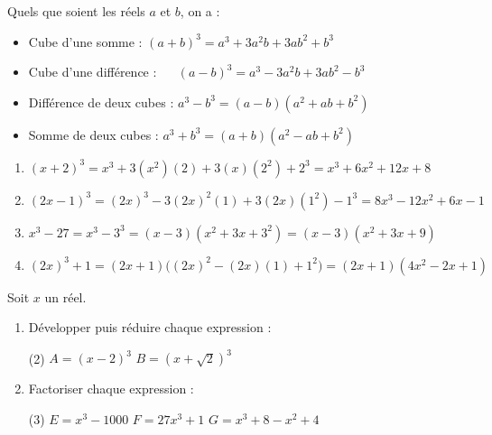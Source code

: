 \documentclass[10pt, a4paper]{article}
\begin{document}
\begin{Propriete}[]
Quels que soient les réels $a$ et $b$, on a :
\begin{itemize}
    \item Cube d'une somme : \quad $(a+b)^3 = a^3 + 3a^2b + 3ab^2 + b^3$
    \item Cube d'une différence : ~~ $(a-b)^3 = a^3 - 3a^2b + 3ab^2 - b^3$
    \item Différence de deux cubes : $a^3 - b^3 = (a-b)(a^2 + ab + b^2)$
    \item Somme de deux cubes : \quad $a^3 + b^3 = (a+b)(a^2 - ab + b^2)$
\end{itemize}
\end{Propriete}

\begin{Exemple}[][15 min]
\begin{enumerate}
  \item $(x + 2)^3 = x^3 + 3(x^2)(2) + 3(x)(2^2) + 2^3 
          = x^3 + 6x^2 + 12x + 8$
          
  \item $(2x - 1)^3 = (2x)^3 - 3(2x)^2(1) + 3(2x)(1^2) - 1^3 
           = 8x^3 - 12x^2 + 6x - 1$
           
  \item $x^3 - 27 = x^3 - 3^3 = (x - 3)(x^2 + 3x + 3^2) 
          = (x - 3)(x^2 + 3x + 9)$

\item $(2x)^3 + 1 = (2x + 1)\big((2x)^2 - (2x)(1) + 1^2\big)
             = (2x + 1)(4x^2 - 2x + 1)$
\end{enumerate}
\end{Exemple}

\begin{Application}[][20 min]
Soit $x$ un réel.
\begin{enumerate}
    \item Développer puis réduire chaque expression :
    \begin{tasks}[label=$\bullet$, label-width=5pt, item-indent=15pt](2)
        \task $A = (x - 2)^3$
        \task $B = (x + \sqrt{2})^3$
    \end{tasks}

    \item Factoriser chaque expression :
    \begin{tasks}[label=$\bullet$, label-width=5pt, item-indent=15pt](3)
        \task $E = x^3 - 1000$
        \task $F =  27x^3 + 1$
        \task $G = x^3 + 8 - x^2 + 4$
    \end{tasks}

\end{enumerate}
\end{Application}
\end{document}
